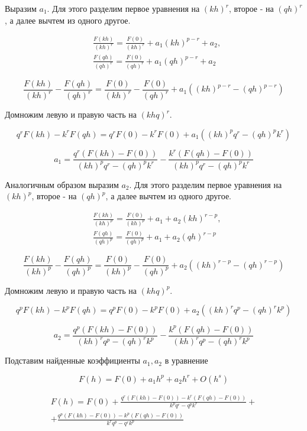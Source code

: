 \documentclass[oneside,final,12pt]{article}
\begin{document}
Выразим $a_1$. Для этого разделим первое уравнения на $(kh)^r$, второе - на $(qh)^r$, а далее вычтем из одного другое.

\begin{align*}
& \frac{F(kh)}{(kh)^r} = \frac{F(0)}{(kh)^r} + a_1(kh)^{p-r} + a_2, \\
& \frac{F(qh)}{(qh)^r} = \frac{F(0)}{(qh)^r} + a_1(qh)^{p-r} + a_2
\end{align*}

$$
\frac{F(kh)}{(kh)^r} - \frac{F(qh)}{(qh)^r} = \frac{F(0)}{(kh)^r} - \frac{F(0)}{(qh)^r} + 
a_1((kh)^{p-r} - (qh)^{p-r})
$$

\bigskip
Домножим левую и правую часть на $(khq)^r$.

$$
q^r F(kh) - k^r F(qh) = q^r F(0) - k^r F(0) + a_1 ((kh)^p q^r - (qh)^p k^r)
$$

$$
a_1 = \frac{q^r (F(kh) - F(0))}{(kh)^p q^r - (qh)^p k^r} - 
	  \frac{k^r (F(qh) - F(0))}{(kh)^p q^r - (qh)^p k^r}
$$

\bigskip
Аналогичным образом выразим $a_2$. Для этого разделим первое уравнения на $(kh)^p$, второе - на $(qh)^p$, а далее вычтем из одного другое.

\begin{align*}
& \frac{F(kh)}{(kh)^p} = \frac{F(0)}{(kh)^p} + a_1 + a_2 (kh)^{r-p}, \\
& \frac{F(qh)}{(qh)^p} = \frac{F(0)}{(qh)^p} + a_1 + a_2 (qh)^{r-p}
\end{align*}

$$
\frac{F(kh)}{(kh)^p} - \frac{F(qh)}{(qh)^p} = \frac{F(0)}{(kh)^p} - \frac{F(0)}{(qh)^p} + 
a_2((kh)^{r-p} - (qh)^{r-p})
$$

\bigskip
Домножим левую и правую часть на $(khq)^p$.

$$
q^p F(kh) - k^p F(qh) = q^p F(0) - k^p F(0) + a_2 ((kh)^r q^p - (qh)^r k^p)
$$

$$
a_2 = \frac{q^p (F(kh) - F(0))}{(kh)^r q^p - (qh)^r k^p} - 
	  \frac{k^p (F(qh) - F(0))}{(kh)^r q^p - (qh)^r k^p}
$$

\bigskip
Подставим найденные коэффициенты $a_1, a_2$ в уравнение

$$
F(h) = F(0) + a_1 h^p + a_2 h^r + O(h^s)
$$

\begin{equation*}
\begin{gathered}
F(h) = F(0) + \frac{q^r (F(kh)-F(0)) - k^r (F(qh)-F(0))}{k^p q^r - q^p k^r} + \\
+ \frac{q^p (F(kh)-F(0)) - k^p (F(qh)-F(0))}{k^r q^p - q^r k^p}
\end{gathered}
\end{equation*}
\end{document}
